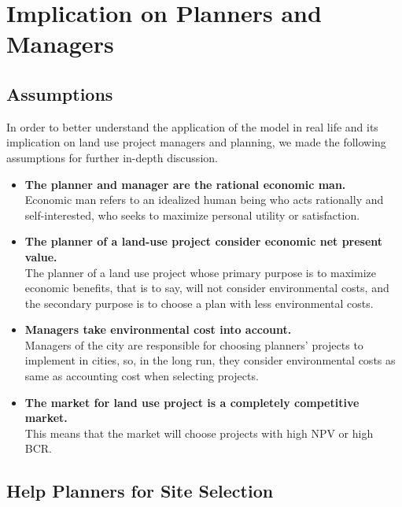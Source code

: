 \documentclass{mcmthesis}
\begin{document}
	\section{Implication on Planners and Managers}		
	
		\subsection{Assumptions}
		
			In order to better understand the application of the model in real life and its implication on land use project managers and planning, we made the following assumptions for further in-depth discussion.
			
			\begin{itemize}
				
				\item \textbf{The planner and manager are the rational economic man.} \\
				Economic man refers to an idealized human being who acts rationally and self-interested, who seeks to maximize personal utility or satisfaction.
				
				\item \textbf{The planner of a land-use project consider economic net present value.} \\
				The planner of a land use project whose primary purpose is to maximize economic benefits, that is to say, will not consider environmental costs, and the secondary purpose is to choose a plan with less environmental costs.
				
				\item \textbf{Managers take environmental cost into account.} \\
				Managers of the city are responsible for choosing planners' projects to implement in cities, so, in the long run, they consider environmental costs as same as accounting cost when selecting projects.
				
				\item \textbf{The market for land use project is a completely competitive market.} \\
				This means that the market will choose projects with high NPV or high BCR.
				
			\end{itemize}
		
		\subsection{Help Planners for Site Selection}
		
\end{document}
